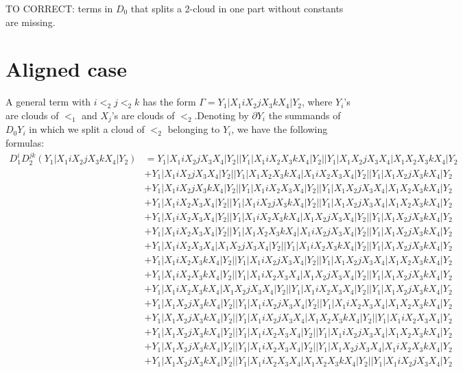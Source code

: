 \documentclass{article}[12pt]
\begin{document}
TO CORRECT: terms in $D_0$ that splits a 2-cloud in one part without constants are missing.
\section*{Aligned case}
 A general term with $i<_2 j <_2 k$ has the form $\Gamma = Y_1|X_1 iX_2 j X_3 k X_4 | Y_2$, where $Y_i$'s are clouds of $<_1$ and $X_j$'s are clouds of $<_2$.Denoting by $\partial Y_i$ the summands of $D_0 Y_i$ in which we split a cloud of $<_2$ belonging to $Y_i$, we have the following formulas:
\begin{align*}
D_1^iD_2^{jk}(Y_1|X_1iX_2jX_3kX_4|Y_2)& =Y_1|X_1iX_2jX_3X_4|Y_2||Y_1|X_1iX_2X_3kX_4|Y_2||Y_1|X_1X_2jX_3X_4|X_1X_2X_3kX_4|Y_2\\ 
 & +Y_1|X_1iX_2jX_3X_4|Y_2||Y_1|X_1X_2X_3kX_4|X_1iX_2X_3X_4|Y_2||Y_1|X_1X_2jX_3kX_4|Y_2\\ 
 & +Y_1|X_1iX_2jX_3kX_4|Y_2||Y_1|X_1iX_2X_3X_4|Y_2||Y_1|X_1X_2jX_3X_4|X_1X_2X_3kX_4|Y_2\\ 
 & +Y_1|X_1iX_2X_3X_4|Y_2||Y_1|X_1iX_2jX_3kX_4|Y_2||Y_1|X_1X_2jX_3X_4|X_1X_2X_3kX_4|Y_2\\ 
 & +Y_1|X_1iX_2X_3X_4|Y_2||Y_1|X_1iX_2X_3kX_4|X_1X_2jX_3X_4|Y_2||Y_1|X_1X_2jX_3kX_4|Y_2\\ 
 & +Y_1|X_1iX_2X_3X_4|Y_2||Y_1|X_1X_2X_3kX_4|X_1iX_2jX_3X_4|Y_2||Y_1|X_1X_2jX_3kX_4|Y_2\\ 
 & +Y_1|X_1iX_2X_3X_4|X_1X_2jX_3X_4|Y_2||Y_1|X_1iX_2X_3kX_4|Y_2||Y_1|X_1X_2jX_3kX_4|Y_2\\ 
 & +Y_1|X_1iX_2X_3kX_4|Y_2||Y_1|X_1iX_2jX_3X_4|Y_2||Y_1|X_1X_2jX_3X_4|X_1X_2X_3kX_4|Y_2\\ 
 & +Y_1|X_1iX_2X_3kX_4|Y_2||Y_1|X_1iX_2X_3X_4|X_1X_2jX_3X_4|Y_2||Y_1|X_1X_2jX_3kX_4|Y_2\\ 
 & +Y_1|X_1iX_2X_3kX_4|X_1X_2jX_3X_4|Y_2||Y_1|X_1iX_2X_3X_4|Y_2||Y_1|X_1X_2jX_3kX_4|Y_2\\ 
 & +Y_1|X_1X_2jX_3kX_4|Y_2||Y_1|X_1iX_2jX_3X_4|Y_2||Y_1|X_1iX_2X_3X_4|X_1X_2X_3kX_4|Y_2\\ 
 & +Y_1|X_1X_2jX_3kX_4|Y_2||Y_1|X_1iX_2jX_3X_4|X_1X_2X_3kX_4|Y_2||Y_1|X_1iX_2X_3X_4|Y_2\\ 
 & +Y_1|X_1X_2jX_3kX_4|Y_2||Y_1|X_1iX_2X_3X_4|Y_2||Y_1|X_1iX_2jX_3X_4|X_1X_2X_3kX_4|Y_2\\ 
 & +Y_1|X_1X_2jX_3kX_4|Y_2||Y_1|X_1iX_2X_3X_4|Y_2||Y_1|X_1X_2jX_3X_4|X_1iX_2X_3kX_4|Y_2\\ 
 & +Y_1|X_1X_2jX_3kX_4|Y_2||Y_1|X_1iX_2X_3X_4|X_1X_2X_3kX_4|Y_2||Y_1|X_1iX_2jX_3X_4|Y_2\\ 

\end{align*}
\end{document}
